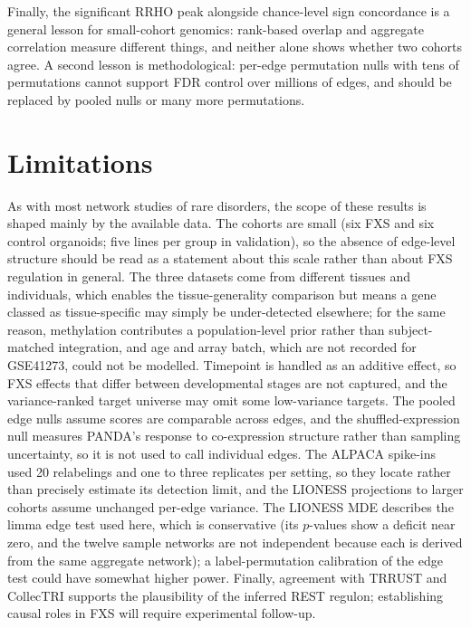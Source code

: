 \documentclass[journal]{IEEEtran}
\begin{document}
Finally, the significant RRHO peak alongside chance-level sign concordance is a general lesson for small-cohort genomics: rank-based overlap and aggregate correlation measure different things, and neither alone shows whether two cohorts agree. A second lesson is methodological: per-edge permutation nulls with tens of permutations cannot support FDR control over millions of edges, and should be replaced by pooled nulls or many more permutations.

\section{Limitations}
As with most network studies of rare disorders, the scope of these results is shaped mainly by the available data. The cohorts are small (six FXS and six control organoids; five lines per group in validation), so the absence of edge-level structure should be read as a statement about this scale rather than about FXS regulation in general. The three datasets come from different tissues and individuals, which enables the tissue-generality comparison but means a gene classed as tissue-specific may simply be under-detected elsewhere; for the same reason, methylation contributes a population-level prior rather than subject-matched integration, and age and array batch, which are not recorded for GSE41273, could not be modelled. Timepoint is handled as an additive effect, so FXS effects that differ between developmental stages are not captured, and the variance-ranked target universe may omit some low-variance targets. The pooled edge nulls assume scores are comparable across edges, and the shuffled-expression null measures PANDA's response to co-expression structure rather than sampling uncertainty, so it is not used to call individual edges. The ALPACA spike-ins used 20 relabelings and one to three replicates per setting, so they locate rather than precisely estimate its detection limit, and the LIONESS projections to larger cohorts assume unchanged per-edge variance. The LIONESS MDE describes the limma edge test used here, which is conservative (its $p$-values show a deficit near zero, and the twelve sample networks are not independent because each is derived from the same aggregate network); a label-permutation calibration of the edge test could have somewhat higher power. Finally, agreement with TRRUST and CollecTRI supports the plausibility of the inferred REST regulon; establishing causal roles in FXS will require experimental follow-up.
\end{document}
